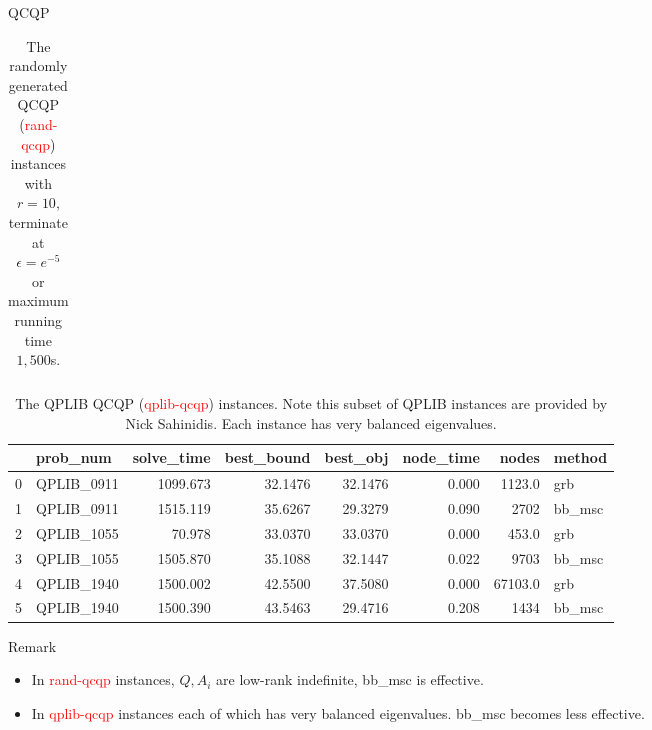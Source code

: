 \documentclass[aspectratio=1610, 9pt]{beamer}
\newcommand{\redsf}[1]{\textcolor{red}{\textsf{#1}}}
\begin{document}
\begin{frame}[standout]{QCQP}
\begin{table}[h!]
\begin{tabular}{llrrrrrl}
      \bottomrule
    \end{tabular}
    \caption{The randomly generated QCQP (\redsf{rand-qcqp}) instances with \(r = 10\), terminate at \(\epsilon = e^{-5}\) or maximum running time \(1,500\)s. }
  \end{table}
  \begin{table}[h!]
    \begin{tabular}{llrrrrrl}
      \toprule
      {} & prob\_num   & solve\_time & best\_bound & best\_obj & node\_time & nodes   & method  \\
      \midrule
      0  & QPLIB\_0911 & 1099.673    & 32.1476     & 32.1476   & 0.000      & 1123.0  & grb     \\
      1  & QPLIB\_0911 & 1515.119    & 35.6267     & 29.3279   & 0.090      & 2702    & bb\_msc \\
      2  & QPLIB\_1055 & 70.978      & 33.0370     & 33.0370   & 0.000      & 453.0   & grb     \\
      3  & QPLIB\_1055 & 1505.870    & 35.1088     & 32.1447   & 0.022      & 9703    & bb\_msc \\
      4  & QPLIB\_1940 & 1500.002    & 42.5500     & 37.5080   & 0.000      & 67103.0 & grb     \\
      5  & QPLIB\_1940 & 1500.390    & 43.5463     & 29.4716   & 0.208      & 1434    & bb\_msc \\
      \bottomrule
    \end{tabular}
    \caption{The QPLIB QCQP (\redsf{qplib-qcqp}) instances. Note this subset of QPLIB instances are provided by Nick Sahinidis. Each instance has very balanced eigenvalues.}
  \end{table}

  \normalsize
  Remark
  \begin{itemize}
    \item In \redsf{rand-qcqp} instances, \(Q, A_i\) are low-rank indefinite, bb\_msc is effective.
    \item In \redsf{qplib-qcqp} instances each of which has very balanced eigenvalues. bb\_msc becomes less effective.
  \end{itemize}
\end{frame}
\end{document}

